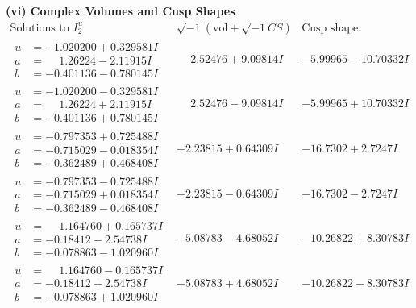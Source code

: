 \documentclass[1p]{elsarticle_modified}
\theoremstyle{definition}
\newcommand{\I}{\sqrt{-1}}
\begin{document}
\newpage\flushleft \textbf{(vi) Complex Volumes and Cusp Shapes}
$$\begin{array}{c|c|c}  
\text{Solutions to }I^u_{2}& \I (\text{vol} + \sqrt{-1}CS) & \text{Cusp shape}\\
 \hline 
\begin{aligned}
u &= -1.020200 + 0.329581 I \\
a &= \phantom{-}1.26224 - 2.11915 I \\
b &= -0.401136 - 0.780145 I\end{aligned}
 & \phantom{-}2.52476 + 9.09814 I & -5.99965 - 10.70332 I \\ \hline\begin{aligned}
u &= -1.020200 - 0.329581 I \\
a &= \phantom{-}1.26224 + 2.11915 I \\
b &= -0.401136 + 0.780145 I\end{aligned}
 & \phantom{-}2.52476 - 9.09814 I & -5.99965 + 10.70332 I \\ \hline\begin{aligned}
u &= -0.797353 + 0.725488 I \\
a &= -0.715029 - 0.018354 I \\
b &= -0.362489 + 0.468408 I\end{aligned}
 & -2.23815 + 0.64309 I & -16.7302 + 2.7247 I \\ \hline\begin{aligned}
u &= -0.797353 - 0.725488 I \\
a &= -0.715029 + 0.018354 I \\
b &= -0.362489 - 0.468408 I\end{aligned}
 & -2.23815 - 0.64309 I & -16.7302 - 2.7247 I \\ \hline\begin{aligned}
u &= \phantom{-}1.164760 + 0.165737 I \\
a &= -0.18412 - 2.54738 I \\
b &= -0.078863 - 1.020960 I\end{aligned}
 & -5.08783 - 4.68052 I & -10.26822 + 8.30783 I \\ \hline\begin{aligned}
u &= \phantom{-}1.164760 - 0.165737 I \\
a &= -0.18412 + 2.54738 I \\
b &= -0.078863 + 1.020960 I\end{aligned}
 & -5.08783 + 4.68052 I & -10.26822 - 8.30783 I \\ \hline\begin{aligned}

\end{aligned}
\end{array}$$
\end{document}
